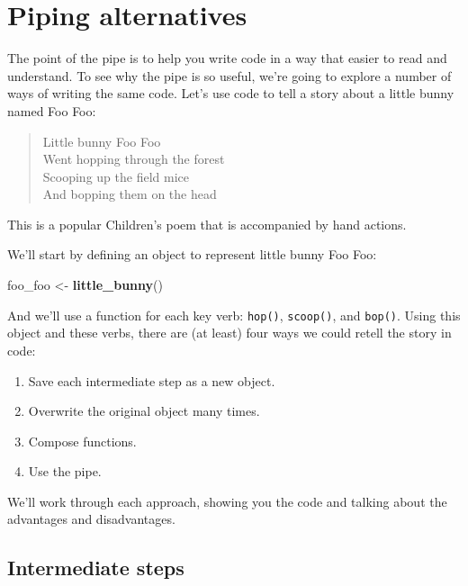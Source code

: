\documentclass[]{book}
\newenvironment{Shaded}{\begin{snugshade}}{\end{snugshade}}
\newcommand{\KeywordTok}[1]{\textcolor[rgb]{0.13,0.29,0.53}{\textbf{{#1}}}}
\newcommand{\StringTok}[1]{\textcolor[rgb]{0.31,0.60,0.02}{{#1}}}
\newcommand{\NormalTok}[1]{{#1}}
\providecommand{\tightlist}{%
  \setlength{\itemsep}{0pt}\setlength{\parskip}{0pt}}
\begin{document}
\section{Piping alternatives}\label{piping-alternatives}

The point of the pipe is to help you write code in a way that easier to
read and understand. To see why the pipe is so useful, we're going to
explore a number of ways of writing the same code. Let's use code to
tell a story about a little bunny named Foo Foo:

\begin{quote}
Little bunny Foo Foo\\
Went hopping through the forest\\
Scooping up the field mice\\
And bopping them on the head
\end{quote}

This is a popular Children's poem that is accompanied by hand actions.

We'll start by defining an object to represent little bunny Foo Foo:

\begin{Shaded}
\begin{Highlighting}[]
\NormalTok{foo_foo <-}\StringTok{ }\KeywordTok{little_bunny}\NormalTok{()}
\end{Highlighting}
\end{Shaded}

And we'll use a function for each key verb: \texttt{hop()},
\texttt{scoop()}, and \texttt{bop()}. Using this object and these verbs,
there are (at least) four ways we could retell the story in code:

\begin{enumerate}
\def\labelenumi{\arabic{enumi}.}
\tightlist
\item
  Save each intermediate step as a new object.
\item
  Overwrite the original object many times.
\item
  Compose functions.
\item
  Use the pipe.
\end{enumerate}

We'll work through each approach, showing you the code and talking about
the advantages and disadvantages.

\subsection{Intermediate steps}\label{intermediate-steps}
\end{document}
